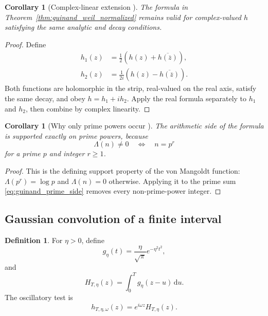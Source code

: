 \documentclass[11pt]{amsart}
\numberwithin{equation}{section}
\theoremstyle{plain}
\newtheorem{corollary}[theorem]{Corollary}
\theoremstyle{definition}
\newtheorem{definition}[theorem]{Definition}
\theoremstyle{remark}
\newcommand{\1}{\mathbf{1}}
\newcommand{\dd}{\,\mathrm{d}}
\begin{document}
\begin{corollary}[Complex-linear extension {}]
\label{cor:guinand_complex_extension}
The formula in Theorem~\ref{thm:guinand_weil_normalized} remains valid
for complex-valued \(h\) satisfying the same analytic and decay
conditions.
\end{corollary}

\begin{proof}
Define
\begin{align}
h_1(z)
&=
\frac12\left(h(z)+\overline{h(\overline z)}\right),
\label{eq:complex_extension_h1}
\\
h_2(z)
&=
\frac1{2i}\left(h(z)-\overline{h(\overline z)}\right).
\label{eq:complex_extension_h2}
\end{align}
Both functions are holomorphic in the strip, real-valued on the real
axis, satisfy the same decay, and obey \(h=h_1+ih_2\).  Apply the real
formula separately to \(h_1\) and \(h_2\), then combine by complex
linearity.
\end{proof}


\begin{corollary}[Why only prime powers occur {}]
\label{cor:explicit_formula_prime_power_support}
The arithmetic side of the formula is supported exactly on prime powers,
because
\begin{equation}
\Lambda(n)\neq0
\quad\Longleftrightarrow\quad
n=p^r
\label{eq:von_mangoldt_support}
\end{equation}
for a prime \(p\) and integer \(r\geq1\).
\end{corollary}

\begin{proof}
This is the defining support property of the von Mangoldt function:
\(\Lambda(p^r)=\log p\) and \(\Lambda(n)=0\) otherwise.  Applying it to
the prime sum \eqref{eq:guinand_prime_side} removes every non-prime-power
integer.
\end{proof}

\subsection{Gaussian convolution of a finite interval}
\label{subsec:gaussian_convolution}

\begin{definition}
\label{def:gaussian_kernel_detailed}
For $\eta>0$, define
\begin{equation}
g_\eta(t)
=
\frac{\eta}{\sqrt\pi}e^{-\eta^2t^2},
\label{eq:gaussian_kernel_detailed}
\end{equation}
and
\begin{equation}
H_{T,\eta}(z)
=
\int_0^Tg_\eta(z-u)\dd u.
\label{eq:H_T_eta_detailed}
\end{equation}
The oscillatory test is
\begin{equation}
h_{T,\eta,\omega}(z)
=
e^{i\omega z}H_{T,\eta}(z).
\label{eq:h_T_eta_omega_detailed}
\end{equation}
\end{definition}
\end{document}
